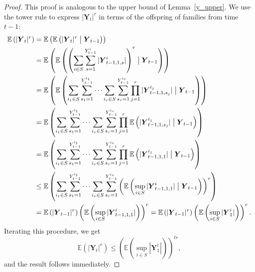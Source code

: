 \documentclass[preprint,3p,12pt]{elsarticle}
\theoremstyle{definition}
\newcommand{\Y}[1][]{%
  \ifx\relax#1\relax
    \boldsymbol{Y}_{t-1, 1, s}^{i}%
  \else
    \boldsymbol{Y}_{t-1, 1, s_{#1}}^{i_{#1}}%
  \fi
}
\begin{document}
\begin{proof}
This proof is analogous to the upper bound of Lemma~\ref{y_upper}. We use the tower rule to express $|\boldsymbol{Y}_t|^r$ in terms of the offspring of families from time $t-1$:
   \begin{align*}
        \mathbb{E}\left(|\boldsymbol{Y}_t|^r\right) %
        &= \mathbb{E}\left(\mathbb{E}\left(|\boldsymbol{Y}_t|^r\bigm|\boldsymbol{Y}_{t-1}\right)\right) \\
        & = \mathbb{E}\left(\mathbb{E}\left(\left(\sum_{i \in S}\sum_{s=1}^{Y_{t-1}^i} |\Y|\right)^r \bigm|\boldsymbol{Y}_{t-1}\right)\right) \\
        & = \mathbb{E}\left(\mathbb{E}\left(\sum_{i_1 \in S}\sum_{s_1=1}^{Y_{t-1}^{i_1}} \dots \sum_{i_r \in S}\sum_{s_r=1}^{Y_{t-1}^{i_r}} \prod_{j=1}^r |\boldsymbol{Y}_{t-1, 1,s_j}^{i_j}| \bigm|\boldsymbol{Y}_{t-1}\right)\right) \\
  &  =\mathbb{E}\left(\sum_{i_1 \in S}\sum_{s_1=1}^{Y_{t-1}^{i_1}} \dots \sum_{i_r \in S}\sum_{s_r=1}^{Y_{t-1}^{i_r}}\prod_{j=1}^r \mathbb{E}\left( |\boldsymbol{Y}_{t-1, 1,s_j}^{i_j}|\bigm|\boldsymbol{Y}_{t-1} \right)\right) \\
    &  =\mathbb{E}\left(\sum_{i_1 \in S}\sum_{s_1=1}^{Y_{t-1}^{i_1}} \dots \sum_{i_r \in S}\sum_{s_r=1}^{Y_{t-1}^{i_r}}\prod_{j=1}^r \mathbb{E}\left( |\boldsymbol{Y}_{t-1, 1,1}^{i_j}|\bigm|\boldsymbol{Y}_{t-1} \right)\right) \\
   &  \le \mathbb{E}\left(\sum_{i_1 \in S}\sum_{s_1=1}^{Y_{t-1}^{i_1}} \dots \sum_{i_r \in S}\sum_{s_r=1}^{Y_{t-1}^{i_r}}\left(\mathbb{E}\left( \sup_{i \in S}  |\boldsymbol{Y}_{t-1,1,1}^{i}| \bigm|\boldsymbol{Y}_{t-1}\right)\right)^r\right) \\
        & = \mathbb{E}\left(|\boldsymbol{Y}_{t-1}|^r\right)\left(\mathbb{E}\left(\sup_{i \in S}|\boldsymbol{Y}_{t-1,1,1}^i|\right)\right)^r  %
        = \mathbb{E}\left(|\boldsymbol{Y}_{t-1}|^r\right)\left(\mathbb{E}\left(\sup_{i \in S}|\boldsymbol{Y}_{1}^i|\right)\right)^r        .
   \end{align*}
    Iterating this procedure, we get
    \begin{equation*}
        \mathbb{E}(|\boldsymbol{Y}_t|^r) \le \left(\mathbb{E}(\sup_{i \in S}|\boldsymbol{Y}_{1}^i|)\right)^{tr},
    \end{equation*}
    and the result follows immediately.
\end{proof}
\end{document}
